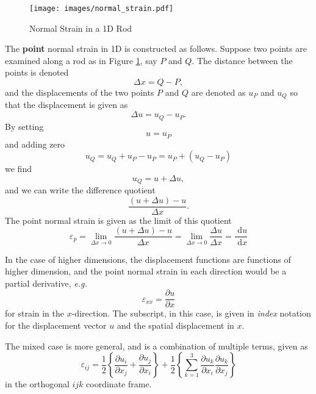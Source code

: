 \begin{figure}[ht!]
\caption{Normal Strain in a 1D Rod}
\centering
\texttt{[image: images/normal\_strain.pdf]}
\label{im:norm.strain}
\end{figure}

The \textbf{point} normal strain in 1D is constructed as follows. Suppose two points are examined along a rod as in Figure \ref{im:norm.strain}, say $P$ and $Q$. The distance between the points is denoted 
\begin{equation}
\Delta x = Q-P,
\end{equation} 
and the displacements of the two points $P$ and $Q$ are denoted as $u_P$ and $u_Q$ so that the displacement is given as 
\begin{equation}
\Delta u = u_Q-u_P.
\end{equation}
By setting 
\begin{equation}
u = u_P
\end{equation}
and adding zero
\begin{equation}
u_Q = u_Q + u_P - u_P = u_P+(u_Q-u_P)
\end{equation}
we find
\begin{equation}
u_Q = u + \Delta u,
\end{equation}
and we can write the difference quotient
\begin{equation}
\frac{(u+\Delta u)-u}{\Delta x}.
\end{equation}
The point normal strain is given as the limit of this quotient
\begin{equation}
\varepsilon_p = \lim_{\Delta x\to 0} \frac{(u+\Delta u)-u}{\Delta x} = \lim_{\Delta x\to 0} \frac{\Delta u}{\Delta x} = \frac{\text{ d}u}{\text{ d}x}
\end{equation}

In the case of higher dimensions, the displacement functions are functions of higher dimension, and the point normal strain in each direction would be a partial derivative, \emph{e.g.}
\begin{equation}
\varepsilon_{xx} = \frac{\partial u}{\partial x}
\label{eq:strain.oned}
\end{equation}
for strain in the $x$-direction. The subscript, in this case, is given in \emph{index} notation for the displacement vector $u$ and the spatial displacement in $x$. 

The mixed case is more general, and is a combination of multiple terms, given as
\begin{equation}
\varepsilon_{ij} = \frac{1}{2}\left\lbrace \frac{\partial u_i}{\partial x_j}+\frac{\partial u_j}{\partial x_i}\right\rbrace +\frac{1}{2}\left\lbrace \sum_{k=1}^3{\frac{\partial u_k}{\partial x_i}\frac{\partial u_k}{\partial x_j}}\right\rbrace
\end{equation}
in the orthogonal $ijk$ coordinate frame.

